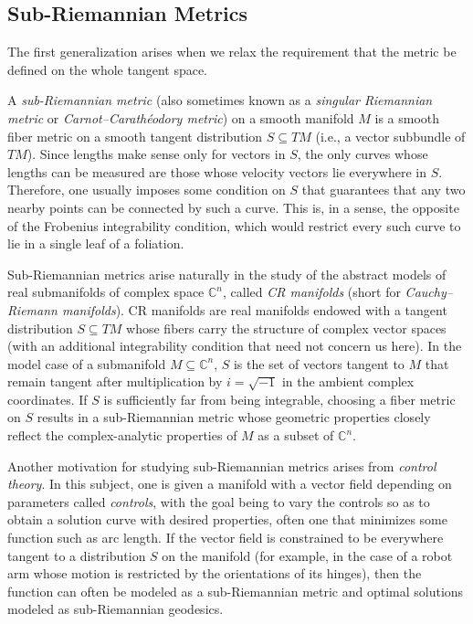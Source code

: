\subsection{Sub-Riemannian Metrics}

The first generalization arises when we relax the requirement that the metric be defined on the whole tangent space.

A \emph{sub-Riemannian metric} (also sometimes known as a \emph{singular Riemannian metric} or \emph{Carnot--Carathéodory metric}) on a smooth manifold $M$ is a smooth fiber metric on a smooth tangent distribution $S \subseteq TM$ (i.e., a vector subbundle of $TM$). Since lengths make sense only for vectors in $S$, the only curves whose lengths can be measured are those whose velocity vectors lie everywhere in $S$. Therefore, one usually imposes some condition on $S$ that guarantees that any two nearby points can be connected by such a curve. This is, in a sense, the opposite of the Frobenius integrability condition, which would restrict every such curve to lie in a single leaf of a foliation.

Sub-Riemannian metrics arise naturally in the study of the abstract models of real submanifolds of complex space $\mathbb{C}^n$, called \emph{CR manifolds} (short for \emph{Cauchy--Riemann manifolds}). CR manifolds are real manifolds endowed with a tangent distribution $S \subseteq TM$ whose fibers carry the structure of complex vector spaces (with an additional integrability condition that need not concern us here). In the model case of a submanifold $M \subseteq \mathbb{C}^n$, $S$ is the set of vectors tangent to $M$ that remain tangent after multiplication by $i = \sqrt{-1}$ in the ambient complex coordinates. If $S$ is sufficiently far from being integrable, choosing a fiber metric on $S$ results in a sub-Riemannian metric whose geometric properties closely reflect the complex-analytic properties of $M$ as a subset of $\mathbb{C}^n$.

Another motivation for studying sub-Riemannian metrics arises from \emph{control theory}. In this subject, one is given a manifold with a vector field depending on parameters called \emph{controls}, with the goal being to vary the controls so as to obtain a solution curve with desired properties, often one that minimizes some function such as arc length. If the vector field is constrained to be everywhere tangent to a distribution $S$ on the manifold (for example, in the case of a robot arm whose motion is restricted by the orientations of its hinges), then the function can often be modeled as a sub-Riemannian metric and optimal solutions modeled as sub-Riemannian geodesics.

